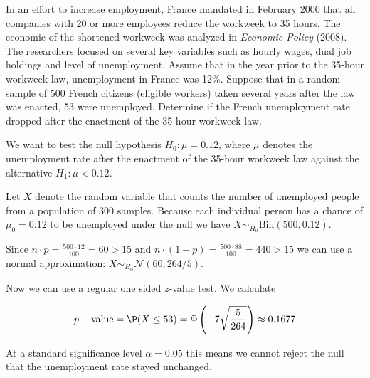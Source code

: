 
\begin{exercise}

In an effort to increase employment, France mandated in February 2000 that
all companies with 20 or more employees reduce the workweek to 35 hours.
The economic of the shortened workweek was analyzed in \textit{Economic Policy}
(2008). The researchers focused on several key variables such as hourly
wages, dual job holdings and level of unemployment. Assume that in the
year prior to the 35-hour workweek law, unemployment in France was 12\%.
Suppose that in a random sample of 500 French citizens (eligible workers)
taken several years after the law was enacted, 53 were unemployed.
Determine if the French unemployment rate dropped after the enactment
of the 35-hour workweek law.

\end{exercise}


\begin{solution}

We want to test the null hypothesis $H_0: \mu = 0.12$, where $\mu$
denotes the unemployment rate after the enactment of the 35-hour workweek law
against the alternative $H_1: \mu < 0.12$.

Let $X$ denote the random variable that counts the number of unemployed
people from a population of 300 samples. Because each individual person
has a chance of $\mu_0 = 0.12$ to be unemployed under the null we have
$X \sim_{H_0} \text{Bin}(500, 0.12)$.

Since $n \cdot p = \frac{500 \cdot 12}{100} = 60 > 15$
and $n \cdot (1 - p) = \frac{500 \cdot 88}{ 100} = 440 > 15$
we can use a normal approximation: $X \sim_{H_0} \mathcal{N}(60, 264/5)$.

Now we can use a regular one sided $z$-value test.
We calculate

\begin{align*}
    p-\text{value} = \P(X \leq 53) = \Phi\left(-7\sqrt{\frac{5}{264}}\right)
    \approx 0.1677
\end{align*}

At a standard significance level $\alpha = 0.05$ this means we cannot
reject the null that the unemployment rate stayed unchanged.
\end{solution}

